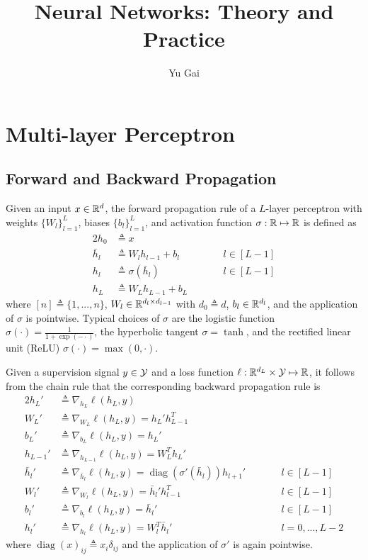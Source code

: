 \documentclass{article}
\title{Neural Networks: Theory and Practice}
\author{Yu Gai}
\date{}
\DeclareMathOperator{\diag}{diag}
\begin{document}
\maketitle

\tableofcontents

\section{Multi-layer Perceptron}

\subsection{Forward and Backward Propagation}

Given an input $x \in {\mathbb R}^d$, the forward propagation rule of a $L$-layer perceptron with weights $\{W_l\}_{l = 1}^L$, biases $\{b_l\}_{l = 1}^L$, and activation function $\sigma: {\mathbb R} \mapsto {\mathbb R}$ is defined as
\begin{alignat*}{2}
h_0 & \triangleq x \\
\bar{h}_l & \triangleq W_l h_{l - 1} + b_l && \qquad l \in [L - 1] \\
h_l & \triangleq \sigma (\bar{h}_l) && \qquad l \in [L - 1] \\
h_L & \triangleq W_L h_{L - 1} + b_L
\end{alignat*}
where $[n] \triangleq \{1, ..., n\}$, $W_l \in {\mathbb R}^{d_l \times d_{l - 1}}$ with $d_0 \triangleq d$, $b_l \in {\mathbb R}^{d_l}$, and the application of $\sigma$ is pointwise.
Typical choices of $\sigma$ are the logistic function $\sigma (\cdot) = \frac1{1 + \exp (-\cdot)}$, the hyperbolic tangent $\sigma = \tanh$, and the rectified linear unit (ReLU) $\sigma (\cdot) = \max (0, \cdot)$.

Given a supervision signal $y \in {\mathcal Y}$ and a loss function $\ell: {\mathbb R}^{d_L} \times {\mathcal Y} \mapsto {\mathbb R}$, it follows from the chain rule that the corresponding backward propagation rule is
\begin{alignat*}{2}
h_L' & \triangleq \nabla_{h_L} \ell (h_L, y) \\
W_L' & \triangleq \nabla_{W_L} \ell (h_L, y) = h_L' h_{L - 1}^T \\
b_L' & \triangleq \nabla_{b_L} \ell (h_L, y) = h_L' \\
h_{L - 1}' & \triangleq \nabla_{h_{L - 1}} \ell (h_L, y) = W_L^T h_L' \\
\bar{h}_l' & \triangleq \nabla_{\bar{h}_l} \ell (h_L, y) = \diag (\sigma' (\bar{h}_l)) h_{l + 1}' && \qquad l \in [L - 1] \\
W_l' & \triangleq \nabla_{W_l} \ell (h_L, y) = \bar{h}_l' h_{l - 1}^T && \qquad l \in [L - 1] \\
b_l' & \triangleq \nabla_{b_l} \ell (h_L, y) = \bar{h}_l' && \qquad l \in [L - 1] \\
h_l' & \triangleq \nabla_{h_l} \ell (h_L, y) = W_l^T \bar{h}_l' && \qquad l = 0, ..., L - 2
\end{alignat*}
where $\diag (x)_{i j} \triangleq x_i \delta_{i j}$ and the application of $\sigma'$ is again pointwise.
\end{document}
